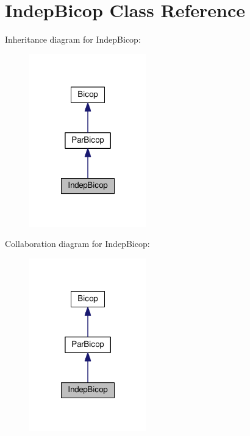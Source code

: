\hypertarget{class_indep_bicop}{\section{Indep\+Bicop Class Reference}
\label{class_indep_bicop}
}


Inheritance diagram for Indep\+Bicop\+:\nopagebreak
\begin{figure}[H]
\begin{center}
\leavevmode
\includegraphics[width=144pt]{class_indep_bicop__inherit__graph}
\end{center}
\end{figure}


Collaboration diagram for Indep\+Bicop\+:\nopagebreak
\begin{figure}[H]
\begin{center}
\leavevmode
\includegraphics[width=144pt]{class_indep_bicop__coll__graph}
\end{center}
\end{figure}
